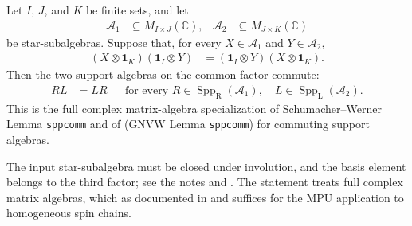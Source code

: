 \begin{lemma}
    \label{thm:qca_overlapping_support_algebras_commute}
    \leanok
    Let $I$, $J$, and $K$ be finite sets, and let
    \begin{align}
        \mathcal A_1 & \subseteq M_{I\times J}(\mathbb C), &
        \mathcal A_2 & \subseteq M_{J\times K}(\mathbb C)
    \end{align}
    be star-subalgebras.  Suppose that, for every
    $X\in\mathcal A_1$ and $Y\in\mathcal A_2$,
    \begin{align}
        (X\otimes\mathbf 1_K)(\mathbf 1_I\otimes Y)
         & =(\mathbf 1_I\otimes Y)(X\otimes\mathbf 1_K).
        \label{eq:qca_overlapping_support_lifts}
    \end{align}
    Then the two support algebras on the common factor commute:
    \begin{align}
        RL & =LR
           &     & \text{for every }
        R\in\operatorname{Spp}_{\mathrm R}(\mathcal A_1),\quad
        L\in\operatorname{Spp}_{\mathrm L}(\mathcal A_2).
        \label{eq:qca_overlapping_support_conclusion}
    \end{align}
    This is the full complex matrix-algebra specialization of
    Schumacher--Werner Lemma \texttt{sppcomm}
    \cite[lines~1174--1194]{SchumacherWerner2004QCA} and of \cite[Section~7.1, lines~1221--1246]{Gross2012IndexTheory} (GNVW Lemma
    \texttt{sppcomm})
    for commuting support algebras.

    The input star-subalgebra must be closed under involution, and the basis
    element belongs to the third factor; see the notes
    \cite{gap:gnvw12_support_algebra_star_closure} and
    \cite{gap:gnvw12_support_algebra_outer_factor_basis}. The statement treats
    full complex matrix algebras, which as documented in \cite[lines~2300--2306, 2313--2334]{Cirac2017MPU} and \cite{gap:gnvw12_support_algebra_full_matrix_scope} suffices for the MPU
    application to homogeneous spin
    chains.
\end{lemma}

